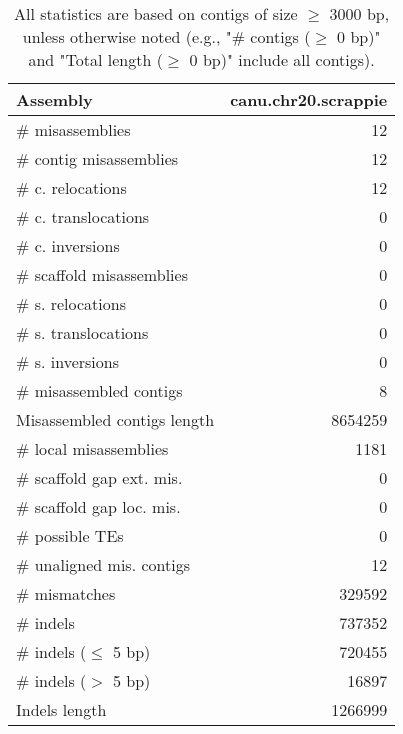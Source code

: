 \documentclass[12pt,a4paper]{article}
\begin{document}
\begin{table}[ht]
\begin{center}
\caption{All statistics are based on contigs of size $\geq$ 3000 bp, unless otherwise noted (e.g., "\# contigs ($\geq$ 0 bp)" and "Total length ($\geq$ 0 bp)" include all contigs).}
\begin{tabular}{|l*{1}{|r}|}
\hline
Assembly & canu.chr20.scrappie \\ \hline
\# misassemblies & 12 \\ \hline
\hspace{2mm}\# contig misassemblies & 12 \\ \hline
\hspace{5mm}\# c. relocations & 12 \\ \hline
\hspace{5mm}\# c. translocations & 0 \\ \hline
\hspace{5mm}\# c. inversions & 0 \\ \hline
\hspace{2mm}\# scaffold misassemblies & 0 \\ \hline
\hspace{5mm}\# s. relocations & 0 \\ \hline
\hspace{5mm}\# s. translocations & 0 \\ \hline
\hspace{5mm}\# s. inversions & 0 \\ \hline
\# misassembled contigs & 8 \\ \hline
Misassembled contigs length & 8654259 \\ \hline
\# local misassemblies & 1181 \\ \hline
\# scaffold gap ext. mis. & 0 \\ \hline
\# scaffold gap loc. mis. & 0 \\ \hline
\# possible TEs & 0 \\ \hline
\# unaligned mis. contigs & 12 \\ \hline
\# mismatches & 329592 \\ \hline
\# indels & 737352 \\ \hline
\hspace{5mm}\# indels ($\leq$ 5 bp) & 720455 \\ \hline
\hspace{5mm}\# indels ($>$ 5 bp) & 16897 \\ \hline
Indels length & 1266999 \\ \hline
\end{tabular}
\end{center}
\end{table}
\end{document}

